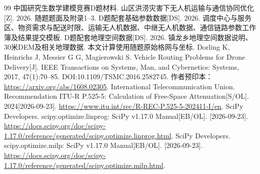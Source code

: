 \documentclass[a4paper]{my_paper}%
\numberwithin{equation}{section}
\theoremstyle{definition}
\begin{document}
\clearpage
{}
\begin{thebibliography}{99}
 中国研究生数学建模竞赛D题材料. 山区洪涝灾害下无人机运输与通信协同优化[Z]. 2026. 随题题面及附录1--3.
 D题配套基础参数数据[DS]. 2026. 调度中心与服务区、物资需求与配送时限、运输无人机数据、中继无人机数据、通信链路参数工作簿及结果提交模板.
 D题配套地理空间数据[DS]. 2026. 镇龙乡地理空间数据说明、30米DEM及相关地理数据. 本文计算使用随题原始格网与坐标.
 Dorling K, Heinrichs J, Messier G G, Magierowski S. Vehicle Routing Problems for Drone Delivery[J]. IEEE Transactions on Systems, Man, and Cybernetics: Systems, 2017, 47(1):70--85. DOI:10.1109/TSMC.2016.2582745. 作者预印本：\url{https://arxiv.org/abs/1608.02305}.
 International Telecommunication Union. Recommendation ITU-R P.525-5: Calculation of Free-Space Attenuation[S/OL]. 2024[2026-09-23]. \url{https://www.itu.int/rec/R-REC-P.525-5-202411-I/en}.
 SciPy Developers. scipy.optimize.linprog: SciPy v1.17.0 Manual[EB/OL]. [2026-09-23]. \url{https://docs.scipy.org/doc/scipy-1.17.0/reference/generated/scipy.optimize.linprog.html}.
 SciPy Developers. scipy.optimize.milp: SciPy v1.17.0 Manual[EB/OL]. [2026-09-23]. \url{https://docs.scipy.org/doc/scipy-1.17.0/reference/generated/scipy.optimize.milp.html}.
\end{thebibliography}

\clearpage\appendix
\end{document}
